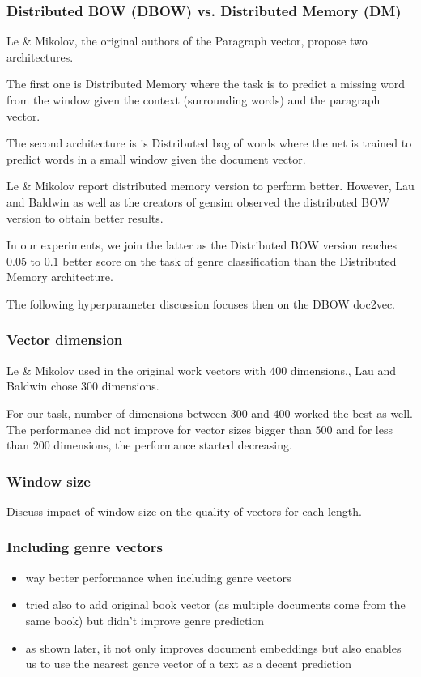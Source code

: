 
\subsubsection{Distributed BOW (DBOW) vs. Distributed Memory (DM)}
Le \& Mikolov, the original authors of the Paragraph vector\cite{doc2vec}, 
propose two architectures.

The first one is Distributed Memory where the task is to predict a missing word from the window given the context (surrounding words) and the paragraph vector.

The second architecture is is Distributed bag of words where the net is trained to predict words in a small window given the document vector.

Le \& Mikolov report distributed memory version to perform better.\cite{doc2vec} However, Lau and Baldwin\cite{doc2vec_params} as well as the creators of gensim\cite{gensim} observed the distributed BOW version to obtain better results.

In our experiments, we join the latter as the Distributed BOW version reaches $0.05$ to $0.1$ better score on the task of genre classification than the Distributed Memory architecture.

The following hyperparameter discussion focuses then on the DBOW doc2vec.

\subsubsection{Vector dimension}
Le \& Mikolov used in the original work vectors with $400$ dimensions.\cite{doc2vec}, Lau and Baldwin chose $300$ dimensions.\cite{doc2vec_params}

For our task, number of dimensions between $300$ and $400$ worked the best as well. The performance did not improve for vector sizes bigger than $500$ and for less than $200$ dimensions, the performance started decreasing.

\subsubsection{Window size}
Discuss impact of window size on the quality of vectors for each length.
\subsubsection{Including genre vectors}
\begin{itemize}
	\item way better performance when including genre vectors
	\item tried also to add original book vector (as multiple documents come from the same book) but didn't improve genre prediction
	\item as shown later, it not only improves document embeddings but also enables us to use the nearest genre vector of a text as a decent prediction
\end{itemize}

